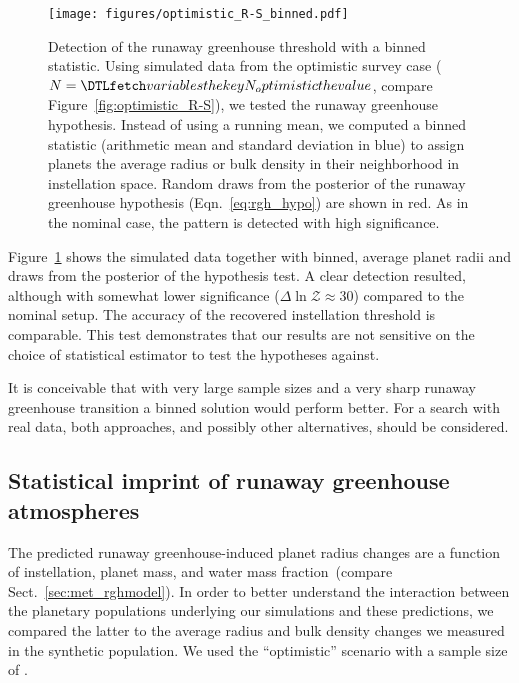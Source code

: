 \documentclass[twocolumn,twocolappendix]{aastex631}
\begin{document}
\begin{figure}[ht!]
    \begin{centering}
        \texttt{[image: figures/optimistic\_R-S\_binned.pdf]}
        \caption{
            Detection of the runaway greenhouse threshold with a binned statistic.
            Using simulated data from the optimistic survey case ($N = \var{N_optimistic}$, compare Figure~\ref{fig:optimistic_R-S}), we tested the runaway greenhouse hypothesis. Instead of using a running mean, we computed a binned statistic (arithmetic mean and standard deviation in blue) to assign planets the average radius or bulk density in their neighborhood in instellation space. Random draws from the posterior of the runaway greenhouse hypothesis (Eqn.~\ref{eq:rgh_hypo}) are shown in red.
            As in the nominal case, the pattern is detected with high significance.
        }
        \label{fig:optimistic_R-S_binned}
    \end{centering}
\end{figure}
Figure~\ref{fig:optimistic_R-S_binned} shows the simulated data together with binned, average planet radii and draws from the posterior of the hypothesis test.
A clear detection resulted, although with somewhat lower significance ($\Delta \ln \mathcal{Z} \approx 30$) compared to the nominal setup.
The accuracy of the recovered instellation threshold is comparable.
This test demonstrates that our results are not sensitive on the choice of statistical estimator to test the hypotheses against.

It is conceivable that with very large sample sizes and a very sharp runaway greenhouse transition a binned solution would perform better.
For a search with real data, both approaches, and possibly other alternatives, should be considered.

\subsection{Statistical imprint of runaway greenhouse atmospheres}\label{app:model-pop_comparison}
The predicted runaway greenhouse-induced planet radius changes are a function of instellation, planet mass, and water mass fraction~(compare Sect.~\ref{sec:met_rghmodel}).
In order to better understand the interaction between the planetary populations underlying our simulations and these predictions, we compared the latter to the average radius and bulk density changes we measured in the synthetic population.
We used the ``optimistic'' scenario with a sample size of .
\end{document}
